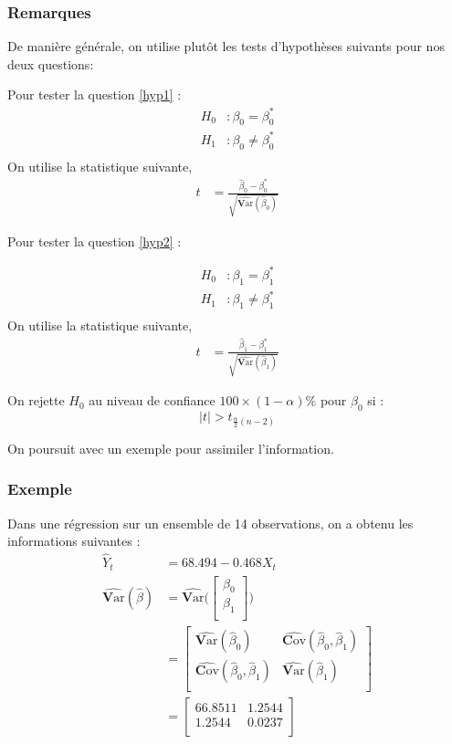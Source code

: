 \documentclass[11pt,french]{report}
\newcommand{\Var}{\mathrm{\textbf{V}ar}}
\newcommand{\Cov}{\mathrm{\textbf{C}ov}}
\begin{document}
\subsubsection*{Remarques}
De manière générale, on utilise plutôt les tests d'hypothèses suivants pour nos deux questions:

Pour tester la question \ref{hyp1} :
\begin{align*}
H_0 &: \beta_0 = \beta_0^* \\
H_1 &: \beta_0 \neq \beta_0^* \\
\end{align*}
On utilise la statistique suivante,
\begin{align*}
t &= \frac{\hat{\beta}_0 - \beta_0^* }{\sqrt{\widehat{\Var}(\hat{\beta}_0)}}
\end{align*}

Pour tester la question  \ref{hyp2} :

\begin{align*}
H_0 &: \beta_1 = \beta_1^* \\
H_1 &: \beta_1 \neq \beta_1^* \\
\end{align*}
On utilise la statistique suivante,
\begin{align*}
t &= \frac{\hat{\beta}_1 - \beta_1^* }{\sqrt{\widehat{\Var}(\hat{\beta}_1)}}
\end{align*}

On rejette $H_0$ au niveau de confiance $100 \times (1 - \alpha)\%$ pour $\beta_0$ si :
$$
|t| > t_{\frac{\alpha}{2}(n-2)}
$$

\bigskip
On poursuit avec un exemple pour assimiler l'information.

\subsubsection*{Exemple}
Dans une régression sur un ensemble de 14 observations, on a obtenu les informations suivantes :
\begin{align*}
\hat{Y}_t &= 68.494 - 0.468X_t \\
\widehat{\Var}(\hat{\beta}) &= \widehat{\Var}\Bigg(
\begin{bmatrix}
  \beta_0 \\
  \beta_1 \\ 
\end{bmatrix}\Bigg) \\
&= 
\begin{bmatrix}
  \widehat{\Var}(\hat{\beta}_0) & \widehat{\Cov}(\hat{\beta}_0, \hat{\beta}_1)\\
  \widehat{\Cov}(\hat{\beta}_0, \hat{\beta}_1)  & \widehat{\Var}(\hat{\beta}_1)\\ 
\end{bmatrix} \\
&= 
\begin{bmatrix}
  66.8511 & 1.2544\\
  1.2544 & 0.0237\\ 
\end{bmatrix} \\
\end{align*}
\end{document}
